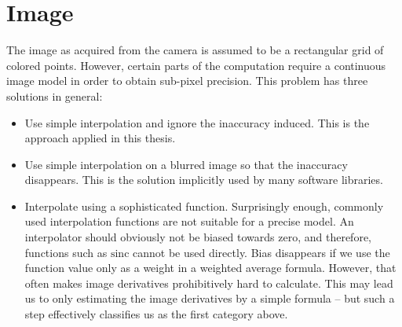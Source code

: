 \section{Image}
The image as acquired from the camera is assumed to be a rectangular grid of colored points.
However, certain parts of the computation require a continuous image model in order to obtain sub-pixel precision.
This problem has three solutions in general:

\begin{itemize}
\item Use simple interpolation and ignore the inaccuracy induced.
This is the approach applied in this thesis.

\item Use simple interpolation on a blurred image so that the inaccuracy disappears.
This is the solution implicitly used by many software libraries.

\item Interpolate using a sophisticated function.
Surprisingly enough, commonly used interpolation functions are not suitable for a precise model.
An interpolator should obviously not be biased towards zero, and therefore, functions such as $\mathrm{sinc}$ cannot be used directly.
Bias disappears if we use the function value only as a weight in a weighted average formula.
However, that often makes image derivatives prohibitively hard to calculate.
This may lead us to only estimating the image derivatives by a simple formula -- but such a step effectively classifies us as the first category above.

\end{itemize}


